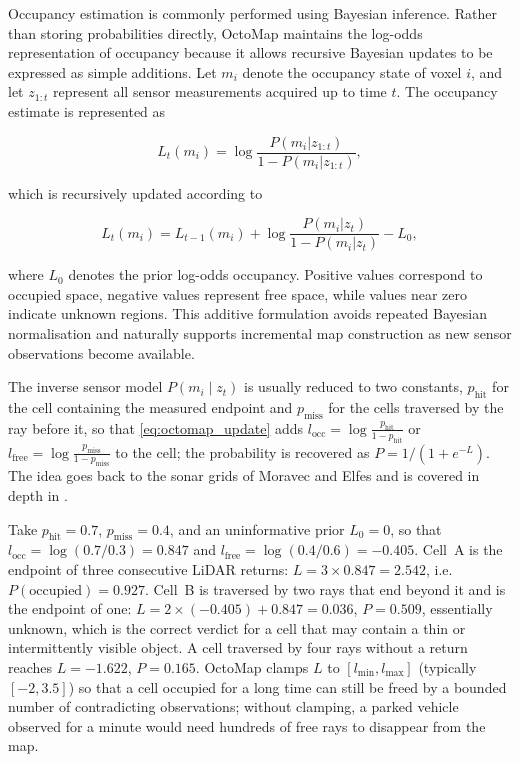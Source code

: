 Occupancy estimation is commonly performed using Bayesian inference. Rather than storing probabilities directly, OctoMap maintains the log-odds representation of occupancy because it allows recursive Bayesian updates to be expressed as simple additions. Let $m_i$ denote the occupancy state of voxel $i$, and let $z_{1:t}$ represent all sensor measurements acquired up to time $t$. The occupancy estimate is represented as

\begin{equation}
L_t(m_i)
=
\log
\frac{P(m_i|z_{1:t})}
     {1-P(m_i|z_{1:t})},
\label{eq:octomap_logodds}
\end{equation}

which is recursively updated according to

\begin{equation}
L_t(m_i)
=
L_{t-1}(m_i)
+
\log
\frac{P(m_i|z_t)}
     {1-P(m_i|z_t)}
-
L_0,
\label{eq:octomap_update}
\end{equation}

where $L_0$ denotes the prior log-odds occupancy. Positive values correspond to occupied space, negative values represent free space, while values near zero indicate unknown regions. This additive formulation avoids repeated Bayesian normalisation and naturally supports incremental map construction as new sensor observations become available.

The inverse sensor model $P(m_i\mid z_t)$ is usually reduced to two constants, $p_{\mathrm{hit}}$ for the cell containing the measured endpoint and $p_{\mathrm{miss}}$ for the cells traversed by the ray before it, so that \eqref{eq:octomap_update} adds $l_{\mathrm{occ}}=\log\frac{p_{\mathrm{hit}}}{1-p_{\mathrm{hit}}}$ or $l_{\mathrm{free}}=\log\frac{p_{\mathrm{miss}}}{1-p_{\mathrm{miss}}}$ to the cell; the probability is recovered as $P=1/(1+e^{-L})$. The idea goes back to the sonar grids of Moravec and Elfes \cite{moravec1985_grid} and is covered in depth in \cite{thrun_probabilistic_2005}.
\begin{example}
\label{ex:logodds}
Take $p_{\mathrm{hit}}=0.7$, $p_{\mathrm{miss}}=0.4$, and an uninformative prior $L_0=0$, so that $l_{\mathrm{occ}}=\log(0.7/0.3)=0.847$ and $l_{\mathrm{free}}=\log(0.4/0.6)=-0.405$. Cell~A is the endpoint of three consecutive LiDAR returns: $L=3\times0.847=2.542$, i.e.\ $P(\text{occupied})=0.927$. Cell~B is traversed by two rays that end beyond it and is the endpoint of one: $L=2\times(-0.405)+0.847=0.036$, $P=0.509$, essentially unknown, which is the correct verdict for a cell that may contain a thin or intermittently visible object. A cell traversed by four rays without a return reaches $L=-1.622$, $P=0.165$. OctoMap clamps $L$ to $[l_{\min},l_{\max}]$ (typically $[-2,3.5]$) so that a cell occupied for a long time can still be freed by a bounded number of contradicting observations; without clamping, a parked vehicle observed for a minute would need hundreds of free rays to disappear from the map.
\end{example}

